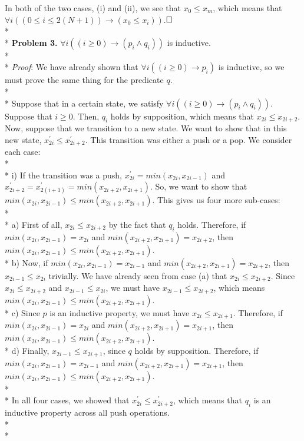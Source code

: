 \documentclass[12pt]{article}
\begin{document}
In both of the two cases, (i) and (ii), we see that $x_0\leq x_m$, which means that $\forall i((0\leq i\leq2(N+1))\rightarrow(x_0\leq x_i))$.$\hfill\Box$\\*\\*
\textbf{Problem 3.} $\forall i((i\geq0)\rightarrow(p_i\wedge q_i))$ is inductive.\\*\\*
\textit{Proof}: We have already shown that $\forall i((i\geq0)\rightarrow p_i)$ is inductive, so we must prove the same thing for the predicate $q$.\\*\\*
Suppose that in a certain state, we satisfy $\forall i((i\geq0)\rightarrow(p_i\wedge q_i))$. Suppose that $i\geq0$. Then, $q_i$ holds by supposition, which means that $x_{2i}\leq x_{2i+2}$. Now, suppose that we transition to a new state. We want to show that in this new state, $x^\prime_{2i}\leq x^\prime_{2i+2}$. This transition was either a push or a pop. We consider each case:\\*\\*
i) If the transition was a push, $x^\prime_{2i}=min(x_{2i},x_{2i-1})$ and $x^\prime_{2i+2}=x^\prime_{2(i+1)}=min(x_{2i+2},x_{2i+1})$. So, we want to show that $min(x_{2i},x_{2i-1})\leq min(x_{2i+2},x_{2i+1})$. This gives us four more sub-cases:\\*\\*
a) First of all, $x_{2i}\leq x_{2i+2}$ by the fact that $q_i$ holds. Therefore, if $min(x_{2i},x_{2i-1})=x_{2i}$ and $min(x_{2i+2},x_{2i+1})=x_{2i+2}$, then $min(x_{2i},x_{2i-1})\leq min(x_{2i+2},x_{2i+1})$.\\*
b) Now, if $min(x_{2i},x_{2i-1})=x_{2i-1}$ and $min(x_{2i+2},x_{2i+1})=x_{2i+2}$, then $x_{2i-1}\leq x_{2i}$ trivially. We have already seen from case (a) that $x_{2i}\leq x_{2i+2}$. Since $x_{2i}\leq x_{2i+2}$ and $x_{2i-1}\leq x_{2i}$, we must have $x_{2i-1}\leq x_{2i+2}$, which means $min(x_{2i},x_{2i-1})\leq min(x_{2i+2},x_{2i+1})$.\\*
c) Since $p$ is an inductive property, we must have $x_{2i}\leq x_{2i+1}$. Therefore, if $min(x_{2i},x_{2i-1})=x_{2i}$ and $min(x_{2i+2},x_{2i+1})=x_{2i+1}$, then $min(x_{2i},x_{2i-1})\leq min(x_{2i+2},x_{2i+1})$.\\*
d) Finally, $x_{2i-1}\leq x_{2i+1}$, since $q$ holds by supposition. Therefore, if $min(x_{2i},x_{2i-1})=x_{2i-1}$ and $min(x_{2i+2},x_{2i+1})=x_{2i+1}$, then $min(x_{2i},x_{2i-1})\leq min(x_{2i+2},x_{2i+1})$.\\*\\*
In all four cases, we showed that $x^\prime_{2i}\leq x^\prime_{2i+2}$, which means that $q_i$ is an inductive property across all push operations.\\*\\*
\end{document}
